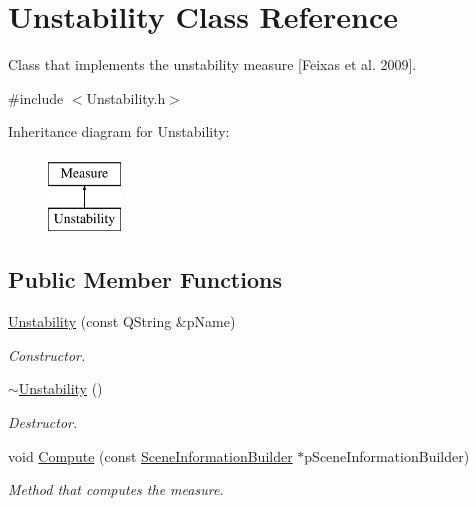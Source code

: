 \hypertarget{class_unstability}{\section{Unstability Class Reference}
\label{class_unstability}
}


Class that implements the unstability measure \mbox{[}Feixas et al. 2009\mbox{]}.  




{\ttfamily \#include $<$Unstability.\+h$>$}

Inheritance diagram for Unstability\+:\begin{figure}[H]
\begin{center}
\leavevmode
\includegraphics[height=2.000000cm]{class_unstability}
\end{center}
\end{figure}
\subsection*{Public Member Functions}
\begin{DoxyCompactItemize}
\item 
\hyperlink{class_unstability_ada763fa1d19c58de213e9ae11dea1fa7}{Unstability} (const Q\+String \&p\+Name)
\begin{DoxyCompactList}\small\item\em Constructor. \end{DoxyCompactList}\item 
\hyperlink{class_unstability_a42fdfb4e3d55fc8677bf2d19981598c1}{$\sim$\+Unstability} ()
\begin{DoxyCompactList}\small\item\em Destructor. \end{DoxyCompactList}\item 
void \hyperlink{class_unstability_af8f9b9afd117ae4a2e237347147d6e8c}{Compute} (const \hyperlink{class_scene_information_builder}{Scene\+Information\+Builder} $\ast$p\+Scene\+Information\+Builder)
\begin{DoxyCompactList}\small\item\em Method that computes the measure. \end{DoxyCompactList}\end{DoxyCompactItemize}
